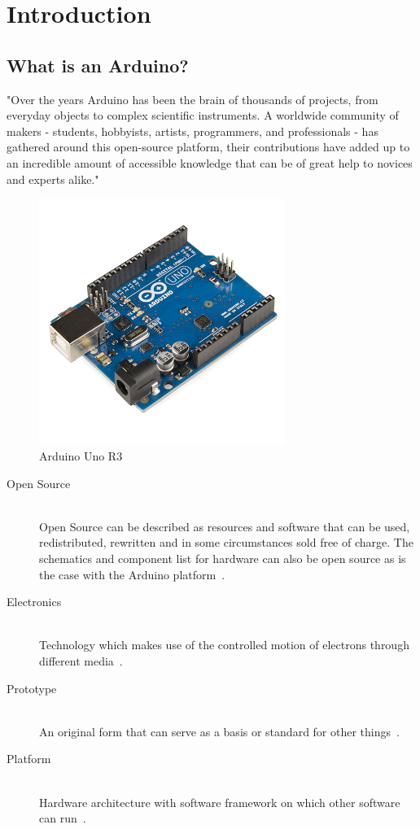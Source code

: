 \newpage
\chapter*{Introduction}

\section*{What is an Arduino?}

"Over the years \gls{Arduino} has been the brain of thousands of projects, from everyday objects to complex scientific instruments. A worldwide community of makers - students, hobbyists, artists, programmers, and professionals - has gathered around this open-source platform, their contributions have added up to an incredible amount of accessible knowledge that can be of great help to novices and experts alike."~\citep{arduino-15-a} 

%
\begin{figure}[ht]
	\centering
	\includegraphics[width=8cm]{images/01}
	\caption{Arduino Uno R3 \citep{wikipedia-13}}
	\label{fig:arduino_uno_r3}
\end{figure}
%


\begin{description}
	\item[Open Source] \hfill \\
	Open Source can be described as resources and software that can be used, redistributed, rewritten and in some circumstances sold free of charge. The schematics and component list for hardware can also be open source as is the case with the \gls{Arduino} platform~\citep{culkin-11}.
	
	\item[Electronics] \hfill \\
	Technology which makes use of the controlled motion of electrons through different media~\citep{culkin-11}.
	
	\item[Prototype] \hfill \\
	An original form that can serve as a basis or standard for other things~\citep{culkin-11}.
	
	\item[Platform] \hfill \\
	Hardware architecture with software framework on which other software can run~\citep{culkin-11}.
\end{description}

